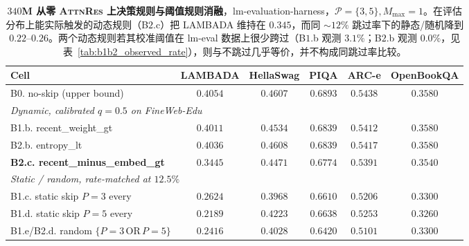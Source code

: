 \documentclass{article}
\newcommand{\attnres}{\textsc{AttnRes}}
\begin{document}
\begin{table}[h]
\caption{\textbf{$340$M 从零 \attnres{} 上决策规则与阈值规则消融}，lm-evaluation-harness，$\mathcal{P}{=}\{3,5\}, M_{\max}{=}1$。在评估分布上能实际触发的动态规则（B$2.$c）把 LAMBADA 维持在 $0.345$，而同 $\sim$$12\%$ 跳过率下的静态/随机降到 $0.22$--$0.26$。两个动态规则若其校准阈值在 lm-eval 数据上很少跨过（B$1.$b 观测 $3.1\%$；B$2.$b 观测 $0.0\%$，见表~\ref{tab:b1b2_observed_rate}），则与不跳过几乎等价，并不构成同跳过率比较。}
\label{tab:b1b2_decision_rule}
\centering\small
\setlength{\tabcolsep}{4pt}
\begin{tabular}{lccccc}
\toprule
Cell & LAMBADA & HellaSwag & PIQA & ARC-e & OpenBookQA \\
\midrule
B0. no-skip (upper bound)                    & $0.4054$ & $0.4607$ & $0.6893$ & $0.5438$ & $0.3580$ \\
\midrule
\multicolumn{6}{l}{\emph{Dynamic, calibrated $q{=}0.5$ on FineWeb-Edu}} \\
B1.b. recent\_weight\_gt                     & $0.4011$ & $0.4534$ & $0.6839$ & $0.5412$ & $0.3580$ \\
B2.b. entropy\_lt                            & $0.4036$ & $0.4608$ & $0.6839$ & $0.5417$ & $0.3580$ \\
\textbf{B2.c. recent\_minus\_embed\_gt}      & $\mathbf{0.3445}$ & $\mathbf{0.4471}$ & $\mathbf{0.6774}$ & $\mathbf{0.5391}$ & $\mathbf{0.3540}$ \\
\midrule
\multicolumn{6}{l}{\emph{Static / random, rate-matched at $12.5\%$}} \\
B1.c. static skip $P{=}3$ every              & $0.2624$ & $0.3968$ & $0.6610$ & $0.5206$ & $0.3300$ \\
B1.d. static skip $P{=}5$ every              & $0.2189$ & $0.4223$ & $0.6638$ & $0.5253$ & $0.3260$ \\
B1.e/B2.d. random $\{P{=}3$\,OR\,$P{=}5\}$   & $0.2416$ & $0.4028$ & $0.6420$ & $0.5101$ & $0.3300$ \\
\bottomrule
\end{tabular}
\end{table}
\end{document}
